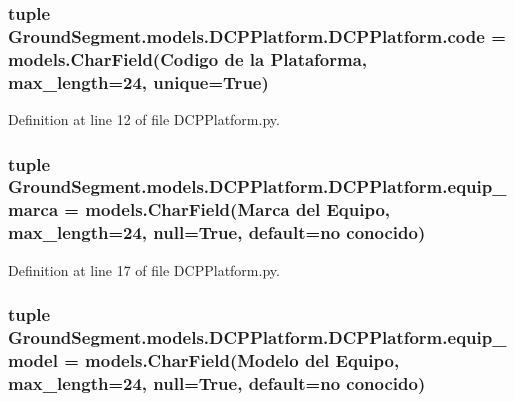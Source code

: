 \subsubsection[{code}]{\setlength{\rightskip}{0pt plus 5cm}tuple Ground\+Segment.\+models.\+D\+C\+P\+Platform.\+D\+C\+P\+Platform.\+code = models.\+Char\+Field(\textquotesingle{}Codigo de la Plataforma\textquotesingle{}, max\+\_\+length=24, unique=True)\hspace{0.3cm}{\ttfamily [static]}}\label{class_ground_segment_1_1models_1_1_d_c_p_platform_1_1_d_c_p_platform_a7af6594b95c64b88b931f0a666c21d30}


Definition at line 12 of file D\+C\+P\+Platform.\+py.

\hypertarget{class_ground_segment_1_1models_1_1_d_c_p_platform_1_1_d_c_p_platform_a346a81e102556b5b1d6e0ffec497b25e}{}
\subsubsection[{equip\+\_\+marca}]{\setlength{\rightskip}{0pt plus 5cm}tuple Ground\+Segment.\+models.\+D\+C\+P\+Platform.\+D\+C\+P\+Platform.\+equip\+\_\+marca = models.\+Char\+Field(\textquotesingle{}Marca del Equipo\textquotesingle{}, max\+\_\+length=24, null=True, default=\textquotesingle{}no conocido\textquotesingle{})\hspace{0.3cm}{\ttfamily [static]}}\label{class_ground_segment_1_1models_1_1_d_c_p_platform_1_1_d_c_p_platform_a346a81e102556b5b1d6e0ffec497b25e}


Definition at line 17 of file D\+C\+P\+Platform.\+py.

\hypertarget{class_ground_segment_1_1models_1_1_d_c_p_platform_1_1_d_c_p_platform_aa74953b95834477d12df1461d8998fa9}{}
\subsubsection[{equip\+\_\+model}]{\setlength{\rightskip}{0pt plus 5cm}tuple Ground\+Segment.\+models.\+D\+C\+P\+Platform.\+D\+C\+P\+Platform.\+equip\+\_\+model = models.\+Char\+Field(\textquotesingle{}Modelo del Equipo\textquotesingle{}, max\+\_\+length=24, null=True, default=\textquotesingle{}no conocido\textquotesingle{})\hspace{0.3cm}{\ttfamily [static]}}\label{class_ground_segment_1_1models_1_1_d_c_p_platform_1_1_d_c_p_platform_aa74953b95834477d12df1461d8998fa9}


